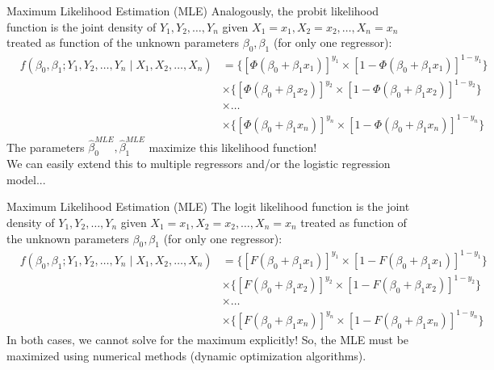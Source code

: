 \documentclass[notes,10pt, aspectratio=169]{beamer}
\begin{document}
\begin{frame}{Maximum Likelihood Estimation (MLE)}
Analogously, the probit likelihood function is the joint density of $Y_1, Y_2, \dots, Y_n$ given $X_1=x_1, X_2=x_2, \dots, X_n=x_n$ treated as function of the unknown parameters $\beta_0, \beta_1$ (for only one regressor):
\begin{eqnarray*}
    &f(\beta_0, \beta_1; Y_1, Y_2, \dots, Y_n \mid X_1, X_2, \dots, X_n) &= \{[\Phi(\beta_0 + \beta_1 x_1)]^{y_1}\times[1-\Phi(\beta_0 + \beta_1 x_1)]^{1-y_1}\}\\
    &{} &\times\{[\Phi(\beta_0 + \beta_1 x_2)]^{y_2}\times[1-\Phi(\beta_0 + \beta_1 x_2)]^{1-y_2}\}\\
    &{} &\times\dots\\
    &{} &\times\{[\Phi(\beta_0 + \beta_1 x_n)]^{y_n} \times[1-\Phi(\beta_0 + \beta_1 x_n)]^{1-y_n}\}
\end{eqnarray*}
The parameters $\hat{\beta}^{MLE}_0, \hat{\beta}^{MLE}_1$ maximize this likelihood function!\\[1em]

We can easily extend this to multiple regressors and/or the logistic regression model...
\end{frame}


\begin{frame}{Maximum Likelihood Estimation (MLE)}
The logit likelihood function is the joint density of $Y_1, Y_2, \dots, Y_n$ given $X_1=x_1, X_2=x_2, \dots, X_n=x_n$ treated as function of the unknown parameters $\beta_0, \beta_1$ (for only one regressor):
\begin{eqnarray*}
    &f(\beta_0, \beta_1; Y_1, Y_2, \dots, Y_n \mid X_1, X_2, \dots, X_n) &= \{[F(\beta_0 + \beta_1 x_1)]^{y_1}\times[1-F(\beta_0 + \beta_1 x_1)]^{1-y_1}\}\\
    &{} &\times\{[F(\beta_0 + \beta_1 x_2)]^{y_2}\times[1-F(\beta_0 + \beta_1 x_2)]^{1-y_2}\}\\
    &{} &\times\dots\\
    &{} &\times\{[F(\beta_0 + \beta_1 x_n)]^{y_n} \times[1-F(\beta_0 + \beta_1 x_n)]^{1-y_n}\}
\end{eqnarray*}
In both cases, we cannot solve for the maximum explicitly! So, the MLE must be maximized using numerical methods (dynamic optimization algorithms).
\end{frame}
\end{document}
